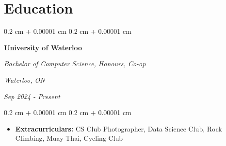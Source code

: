 \documentclass[10pt, letterpaper]{article}
\newenvironment{highlights}{
    \begin{itemize}[
        topsep=0.10 cm,
        parsep=0.10 cm,
        partopsep=0pt,
        itemsep=0pt,
        leftmargin=0.4 cm + 10pt
    ]
}{
    \end{itemize}
} %
\newenvironment{highlightsforbulletentries}{
    \begin{itemize}[
        topsep=0.10 cm,
        parsep=0.10 cm,
        partopsep=0pt,
        itemsep=0pt,
        leftmargin=10pt
    ]
}{
    \end{itemize}
} %
\newenvironment{onecolentry}{
    \begin{adjustwidth}{
        0.2 cm + 0.00001 cm
    }{
        0.2 cm + 0.00001 cm
    }
}{
    \end{adjustwidth}
} %
\newenvironment{twocolentry}[2][]{
    \onecolentry
    \def\secondColumn{#2}
    \setcolumnwidth{\fill, 4.5 cm}
    \begin{paracol}{2}
}{
    \switchcolumn \raggedleft \secondColumn
    \end{paracol}
    \endonecolentry
} %
\let\hrefWithoutArrow\href
\renewcommand{\href}[2]{\hrefWithoutArrow{#1}{\ifthenelse{\equal{#2}{}}{ }{#2 }\raisebox{.15ex}{\footnotesize \faExternalLink*}}}
\begin{document}










    \section{Education}
        
        \begin{twocolentry}{

        \textit{Waterloo, ON}
            
        \textit{Sep 2024 - Present}}
            \textbf{University of Waterloo}

            \textit{Bachelor of Computer Science, Honours, Co-op}
        \end{twocolentry}

        \vspace{0.10 cm}
        \begin{onecolentry}
            \begin{highlights}
                \item \textbf{Extracurriculars:} CS Club Photographer, Data Science Club, Rock Climbing, Muay Thai, Cycling Club
            \end{highlights}
        \end{onecolentry}
\end{document}
